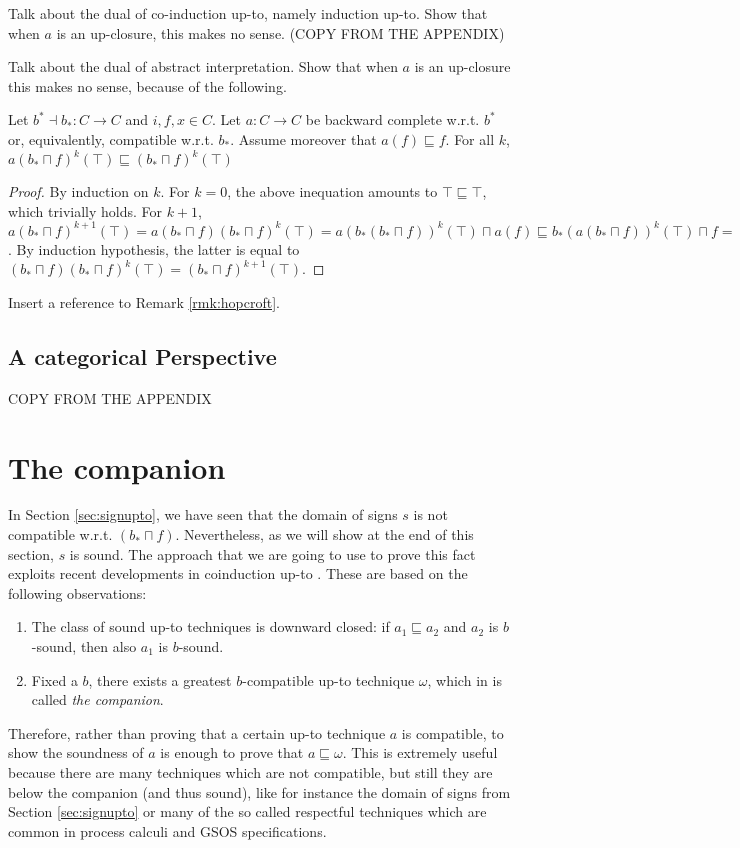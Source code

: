 \documentclass{llncs}
\begin{document}
Talk about the dual of co-induction up-to, namely induction up-to. Show that when $a$ is an up-closure, this makes no sense. (COPY FROM THE APPENDIX)

Talk about the dual of abstract interpretation. Show that when $a$ is an up-closure this makes no sense, because of the following.
%
\begin{proposition}
Let $b^* \dashv b_* \colon C \to C$ and $i,f,x\in C$. Let $a\colon C\to C$ be backward complete w.r.t. $b^*$ or, equivalently, compatible w.r.t. $b_*$. Assume moreover that $a(f)\sqsubseteq f$. For all $k$, $a(b_*\sqcap f)^k(\top) \sqsubseteq (b_*\sqcap f)^k(\top)$
\end{proposition}
\begin{proof}
By induction on $k$. For $k=0$, the above inequation amounts to  $\top \sqsubseteq \top$, which trivially holds.
For $k+1$, $a(b_*\sqcap f)^{k+1}(\top)=a(b_*\sqcap f)(b_*\sqcap f)^k(\top) = a(b_*(b_*\sqcap f))^k(\top) \sqcap a(f) \sqsubseteq b_*(a(b_*\sqcap f))^k(\top) \sqcap f = (b_*\sqcap f)(a(b_*\sqcap f))^k(\top)$. By induction hypothesis, the latter is equal to $(b_*\sqcap f)(b_*\sqcap f)^k(\top)=(b_*\sqcap f)^{k+1}(\top)$.
\end{proof}

Insert a reference to Remark \ref{rmk:hopcroft}.

\subsection{A categorical Perspective}
COPY FROM THE APPENDIX







\section{The companion}
In Section \ref{sec:signupto}, we have seen that the domain of signs $s$ is not compatible w.r.t. $(b_*\sqcap f)$. Nevertheless, as we will show at the end of this section, $s$ is sound.
The approach that we are going to use to prove this fact exploits recent developments in coinduction up-to \cite{hur2013power,pous2016coinduction}. These are based on the following observations:
\begin{enumerate}
\item The class of sound up-to techniques is downward closed: if $a_1\sqsubseteq a_2$ and $a_2$ is $b$-sound, then also $a_1$ is $b$-sound.
\item Fixed a $b$, there exists a greatest $b$-compatible up-to technique $\omega$, which in \cite{pous2016coinduction} is called \emph{the companion}.
\end{enumerate}
Therefore, rather than proving that a certain up-to technique $a$ is compatible, to show the soundness of $a$ is enough to prove that $a \sqsubseteq \omega$. 
%
This is extremely useful because there are many techniques which are not compatible, but still they are below the companion (and thus sound), like for instance the domain of signs from Section \ref{sec:signupto} or many of the so called respectful techniques \cite{San98MFCS} which are common in process calculi and GSOS specifications.
\end{document}
